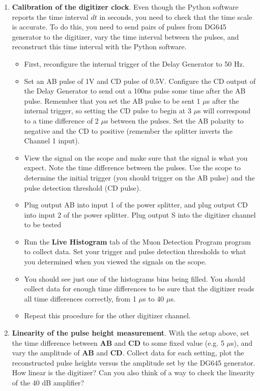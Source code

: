 \documentclass{../lab}
\begin{document}
\begin{enumerate}
    \item \textbf{Calibration of the digitizer clock}. Even though the Python software reports the time interval $dt$ in seconds, you need to check that the time scale is accurate. To do this, you need to send pairs of pulses from DG645 generator to the digitizer, vary the time interval between the pulses, and reconstruct this time interval with the Python software.

    \begin{itemize}
        \item First, reconfigure the internal trigger of the Delay Generator to 50 Hz.

        \item Set an AB pulse of 1V and CD pulse of 0.5V. Configure the CD output of the Delay Generator to send out a 100ns pulse some time after the AB pulse. Remember that you set the AB pulse to be sent 1 $\mu$s after the internal trigger, so setting the CD pulse to begin at 3 $\mu$s will correspond to a time difference of 2 $\mu$s between the pulses. Set the AB polarity to negative and the CD to positive (remember the splitter inverts the Channel 1 input).

        \item View the signal on the scope and make sure that the signal is what you expect. Note the time difference between the pulses. Use the scope to determine the initial trigger (you should trigger on the AB pulse) and the pulse detection threshold (CD pulse). 

        \item Plug output AB into input 1 of the power splitter, and plug output CD into input 2 of the power splitter. Plug output S into the digitizer channel to be tested

        \item Run the \textbf{Live Histogram} tab of the Muon Detection Program program to collect data. Set your trigger and pulse detection thresholds to what you determined when you viewed the signals on the scope.

        \item You should see just one of the histograms bins being filled. You should collect data for enough time differences to be sure that the digitizer reads all time differences correctly, from 1 $\mu$s to 40 $\mu$s.

        \item Repeat this procedure for the other digitizer channel.

    \end{itemize}

    \item \textbf{Linearity of the pulse height measurement}. With the setup above, set the time difference between \textbf{AB} and \textbf{CD} to some fixed value (e.g. 5 $ \mu $s), and vary the amplitude of \textbf{AB} and \textbf{CD}. Collect data for each setting, plot the reconstructed pulse heights versus the amplitude set by the DG645 generator. How linear is the digitizer? Can you also think of a way to check the linearity of the 40 dB amplifier?

\end{enumerate}
\end{document}
